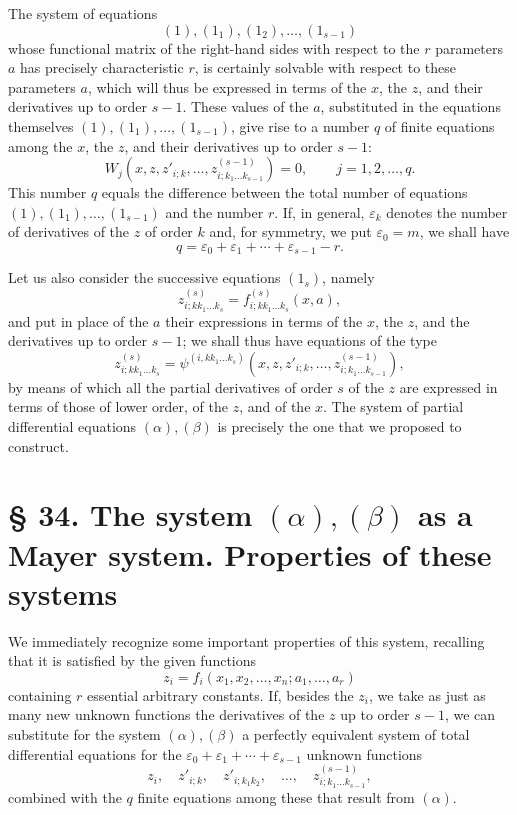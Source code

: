 \documentclass[11pt]{book}
\begin{document}
The system of equations
\[
 (1),(1_1),(1_2),\ldots,(1_{s-1})
\]
whose functional matrix of the right-hand sides with respect to the $r$ parameters $a$ has precisely characteristic $r$, is certainly solvable with respect to these parameters $a$, which will thus be expressed in terms of the $x$, the $z$, and their derivatives up to order $s-1$. These values of the $a$, substituted in the equations themselves $(1),(1_1),\ldots,(1_{s-1})$, give rise to a number $q$ of finite equations among the $x$, the $z$, and their derivatives up to order $s-1$:
\begin{equation*}\tag{$\alpha$}
 W_j(x,z,z'_{i;k},\ldots,z^{(s-1)}_{i;k_1\ldots k_{s-1}})=0,
 \qquad j=1,2,\ldots,q.
\end{equation*}
This number $q$ equals the difference between the total number of equations $(1),(1_1),\ldots,(1_{s-1})$ and the number $r$. If, in general, $\varepsilon_k$ denotes the number of derivatives of the $z$ of order $k$\begingroup\renewcommand\thefootnote{(*)}\footnotemark\endgroup{} and, for symmetry, we put $\varepsilon_0=m$, we shall have
\begingroup\renewcommand\thefootnote{(*)}\endgroup{}
\begin{equation*}\tag{2}
 q=\varepsilon_0+\varepsilon_1+\cdots+\varepsilon_{s-1}-r.
\end{equation*}

Let us also consider the successive equations $(1_s)$, namely
\[
 z^{(s)}_{i;kk_1\ldots k_s}=f^{(s)}_{i;kk_1\ldots k_s}(x,a),
\]
and put in place of the $a$ their expressions in terms of the $x$, the $z$, and the derivatives up to order $s-1$; we shall thus have equations of the type
\begin{equation*}\tag{$\beta$}
 z^{(s)}_{i;kk_1\ldots k_s}
 =\psi^{(i,kk_1\ldots k_s)}(x,z,z'_{i;k},\ldots,z^{(s-1)}_{i;k_1\ldots k_{s-1}}),
\end{equation*}
by means of which all the partial derivatives of order $s$ of the $z$ are expressed in terms of those of lower order, of the $z$, and of the $x$. The system of partial differential equations $(\alpha),(\beta)$ is precisely the one that we proposed to construct.

\section*{\S{} 34. The system $(\alpha),(\beta)$ as a Mayer system. Properties of these systems}

We immediately recognize some important properties of this system, recalling that it is satisfied by the given functions
\[
 z_i=f_i(x_1,x_2,\ldots,x_n; a_1,\ldots,a_r)
\]
containing $r$ essential arbitrary constants. If, besides the $z_i$, we take as just as many new unknown functions the derivatives of the $z$ up to order $s-1$, we can substitute for the system $(\alpha),(\beta)$ a perfectly equivalent system of total differential equations for the $\varepsilon_0+\varepsilon_1+\cdots+\varepsilon_{s-1}$ unknown functions
\[
 z_i,
 \quad z'_{i;k},
 \quad z'_{i;k_1k_2},
 \quad \ldots,
 \quad z^{(s-1)}_{i;k_1\ldots k_{s-1}},
\]
combined with the $q$ finite equations among these that result from $(\alpha)$.
\end{document}
